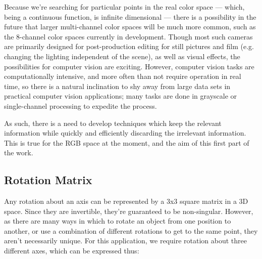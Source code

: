 Because we're searching for particular points in the real color space --- which, being a continuous function, is infinite dimensional --- there is a possibility in the future that larger multi-channel color spaces will be much more common, such as the 8-channel color spaces currently in development. Though most such cameras are primarily designed for post-production editing for still pictures and film (e.g. changing the lighting independent of the scene), as well as visual effects, the possibilities for computer vision are exciting. However, computer vision tasks are computationally intensive, and more often than not require operation in real time, so there is a natural inclination to shy away from large data sets in practical computer vision applications; many tasks are done in grayscale or single-channel processing to expedite the process.



As such, there is a need to develop techniques which keep the relevant information while quickly and efficiently discarding the irrelevant information. This is true for the RGB space at the moment, and the aim of this first part of the work.





\subsection{Rotation Matrix}\label{sec:RotationMatrix}

Any rotation about an axis can be represented by a 3x3 square matrix in a 3D space. Since they are invertible, they're guaranteed to be non-singular. However, as there are many ways in which to rotate an object from one position to another, or use a combination of different rotations to get to the same point, they aren't necessarily unique. For this application, we require rotation about three different axes, which can be expressed thus:



%






